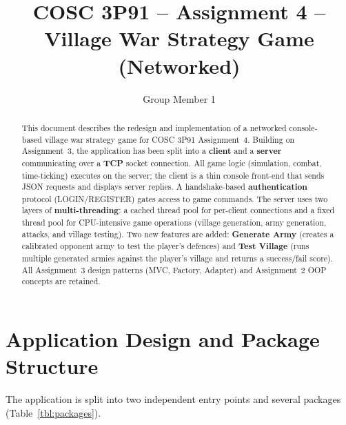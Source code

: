 \documentclass[format=acmsmall, review=false, screen=true]{acmart}
\begin{document}
\title[COSC 3P91 -- Assignment 4]{COSC 3P91 -- Assignment 4 -- Village War Strategy Game (Networked)}

\author{Group Member 1}

\begin{abstract}
This document describes the redesign and implementation of a networked console-based village
war strategy game for COSC 3P91 Assignment~4.  Building on Assignment~3, the application
has been split into a \textbf{client} and a \textbf{server} communicating over a \textbf{TCP}
socket connection.  All game logic (simulation, combat, time-ticking) executes on the server;
the client is a thin console front-end that sends JSON requests and displays server replies.
A handshake-based \textbf{authentication} protocol (LOGIN/REGISTER) gates access to game
commands.  The server uses two layers of \textbf{multi-threading}: a cached thread pool for
per-client connections and a fixed thread pool for CPU-intensive game operations (village
generation, army generation, attacks, and village testing).  Two new features are added:
\textbf{Generate Army} (creates a calibrated opponent army to test the player's defences) and
\textbf{Test Village} (runs multiple generated armies against the player's village and returns
a success/fail score).  All Assignment~3 design patterns (MVC, Factory, Adapter) and
Assignment~2 OOP concepts are retained.
\end{abstract}

\maketitle

\section{Application Design and Package Structure}

The application is split into two independent entry points and several packages
(Table~\ref{tbl:packages}).
\end{document}
